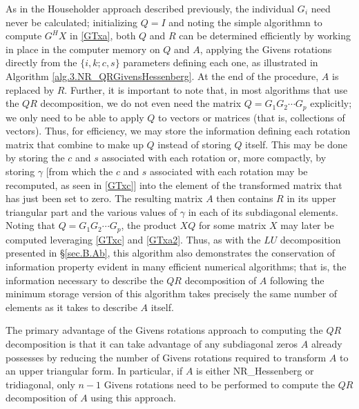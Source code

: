 As in the Householder approach described previously, the individual
$G_{i}$ need never be calculated; initializing $Q=I$ and noting the
simple algorithmn to compute $G^{H}X$ in \eqref{GTxa},
both $Q$ and $R$ can be determined efficiently by working in
place in the computer memory on $Q$ and $A$, applying the Givens
rotations directly from the $\{i,k;c,s\}$ parameters defining each
one, as illustrated in Algorithm \ref{alg.3.NR_QRGivensHessenberg}.
At the end of the procedure, $A$ is replaced by $R$.  Further, it is important to note that, in most algorithms
that use the $QR$ decomposition, we do not even need the matrix
$Q=G_{1}G_{2}\cdots G_{p}$ explicitly; we only need to be able to
apply $Q$ to vectors or matrices (that is, collections of vectors).
Thus, for efficiency, we may store the information defining each
rotation matrix that combine to make up $Q$ instead of storing $Q$ itself.  This may be done by storing the $c$ and $s$ associated with each rotation or,
more compactly, by storing $\gamma$ [from which the $c$ and $s$ associated with each rotation may be recomputed,
as seen in \eqref{GTxc}] into the element of the transformed matrix that has
just been set to zero.  The resulting matrix $A$ then contains $R$ in
its upper triangular part and the various values of $\gamma$ in each
of its subdiagonal elements.  Noting that $Q=G_{1}G_{2}\cdots G_{p}$, the product $XQ$ for some matrix
$X$ may later be computed leveraging \eqref{GTxc} and \eqref{GTxa2}.
Thus, as with the $LU$ decomposition presented in \S \ref{sec.B.Ab},
this algorithm also demonstrates the conservation of information
property evident in many efficient numerical algorithms; that is, the
information necessary to describe the $QR$ decomposition of $A$
following the minimum storage version of this algorithm takes precisely
the same number of elements as it takes to describe $A$ itself.

The primary advantage of the Givens rotations approach to computing
the $QR$ decomposition is that it can take advantage of any subdiagonal zeros $A$ already possesses by reducing the number of Givens
rotations required to transform $A$ to an upper triangular form.  In particular,
if $A$ is either NR_Hessenberg or tridiagonal, only $n-1$ Givens
rotations need to be performed to compute the $QR$ decomposition of
$A$ using this approach.

\enlargethispage{3pt}

\begin{figure*}[t]

\end{figure*}

